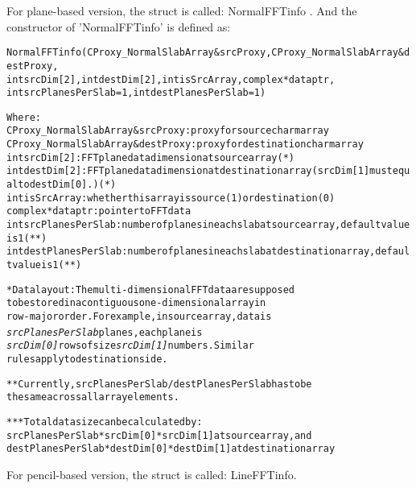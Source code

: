 For plane-based version, the struct is called: NormalFFTinfo . And the
constructor of 'NormalFFTinfo' is defined as:

\begin{alltt}
        NormalFFTinfo(CProxy_NormalSlabArray &srcProxy, CProxy_NormalSlabArray &destProxy,
                      int srcDim[2], int destDim[2], int isSrcArray, complex *dataptr, 
                      int srcPlanesPerSlab=1, int destPlanesPerSlab=1)

        Where: 
        CProxy_NormalSlabArray &srcProxy : proxy for source charm array 
        CProxy_NormalSlabArray &destProxy : proxy for destination charm array 
        int srcDim[2] : FFT plane data dimension at source array (*)
        int destDim[2] : FFT plane data dimension at destination array ( srcDim[1] must equal to destDim[0].) (*) 
        int isSrcArray : whether this array is source (1) or destination (0)
        complex *dataptr : pointer to FFT data 
        int srcPlanesPerSlab : number of planes in each slab at source array, default value is 1 (**) 
        int destPlanesPerSlab : number of planes in each slab at destination array, default value is 1 (**)

          * Data layout : The multi-dimensional FFT data are supposed
            to be stored in a contiguous one-dimensional array in
            row-major order. For example, in source array, data is
            {\it srcPlanesPerSlab} planes, each plane is {\it
            srcDim[0]} rows of size {\it srcDim[1]} numbers. Similar
            rules apply to destination side.


          ** Currently, srcPlanesPerSlab/destPlanesPerSlab has to be
             the same across all array elements.

          *** Total data size can be calculated by:
              srcPlanesPerSlab*srcDim[0]*srcDim[1] at source array, and
              destPlanesPerSlab*destDim[0]*destDim[1] at destination array
 
\end{alltt}



For pencil-based version, the struct is called: LineFFTinfo.

